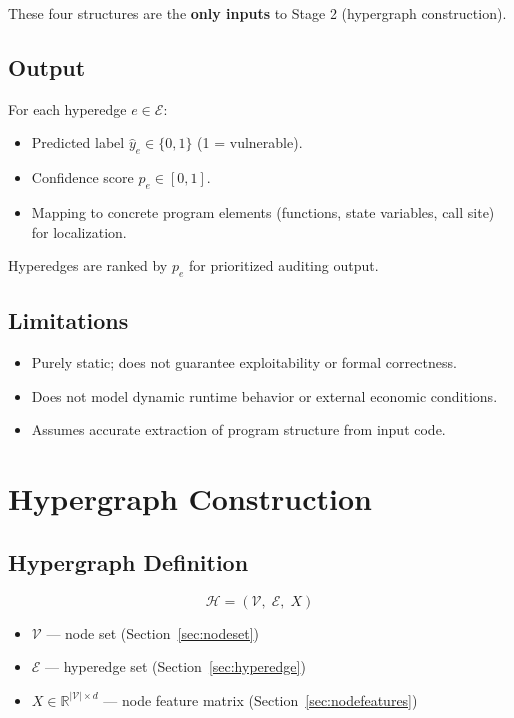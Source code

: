 \documentclass[11pt]{article}
\begin{document}
These four structures are the \textbf{only inputs} to Stage 2 (hypergraph construction).

\subsection{Output}

For each hyperedge $e \in \mathcal{E}$:
\begin{itemize}
    \item Predicted label $\hat{y}_e \in \{0, 1\}$ (1 = vulnerable).
    \item Confidence score $p_e \in [0, 1]$.
    \item Mapping to concrete program elements (functions, state variables, call site) for localization.
\end{itemize}

Hyperedges are ranked by $p_e$ for prioritized auditing output.

\subsection{Limitations}

\begin{itemize}
    \item Purely static; does not guarantee exploitability or formal correctness.
    \item Does not model dynamic runtime behavior or external economic conditions.
    \item Assumes accurate extraction of program structure from input code.
\end{itemize}

\section{Hypergraph Construction}

\subsection{Hypergraph Definition}

\[
\mathcal{H} = (\mathcal{V},\; \mathcal{E},\; X)
\]

\begin{itemize}
    \item $\mathcal{V}$ --- node set (Section~\ref{sec:nodeset})
    \item $\mathcal{E}$ --- hyperedge set (Section~\ref{sec:hyperedge})
    \item $X \in \mathbb{R}^{|\mathcal{V}| \times d}$ --- node feature matrix (Section~\ref{sec:nodefeatures})
\end{itemize}
\end{document}
